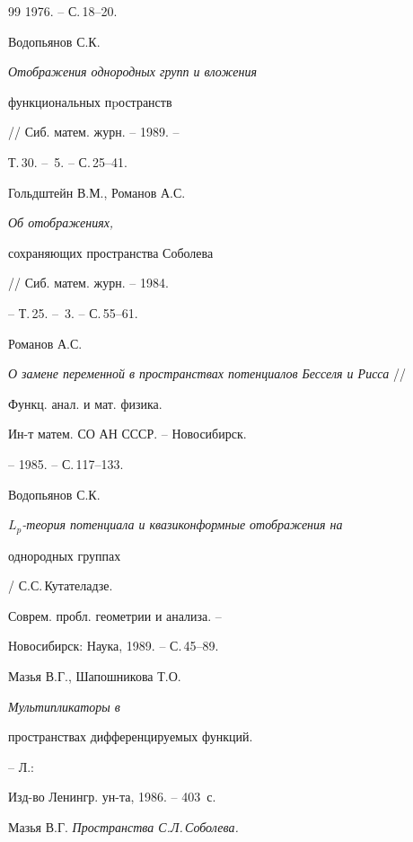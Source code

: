 \begin{thebibliography}{99}
1976. -- С.\,18--20.







Водопьянов С.К. {\it Отображения однородных групп и вложения


функциональных пpостранств} // Сиб. матем. журн. -- 1989. --


Т.\,30. -- \No\,5. -- С.\,25--41.







Гольдштейн В.М., Романов А.С. {\it Об отображениях,


сохраняющих пространства Соболева} // Сиб. матем. журн. -- 1984.


-- Т.\,25. -- \No\,3. -- С.\,55--61.







Романов А.С.


{\it О замене переменной в пространствах потенциалов Бесселя и Рисса} //


Функц. анал. и мат. физика.


Ин-т матем. СО АН СССР. -- Новосибирск.


-- 1985. -- С.\,117--133.







Водопьянов С.К.


{\it $L_p$-теория потенциала и квазиконформные отображения на 


однородных группах} /  С.С.\,Кутателадзе.


Соврем. пробл. геометрии и анализа. --


Новосибирск: Наука, 1989. -- С.\,45--89.







Мазья В.Г., Шапошникова Т.О. {\it Мультипликаторы в


пространствах дифференцируемых функций.} -- Л.:


Изд-во Ленингр. ун-та, 1986. -- 403~с.







Мазья В.Г. {\it Пространства С.Л.\,Соболева.}



\end{thebibliography}

